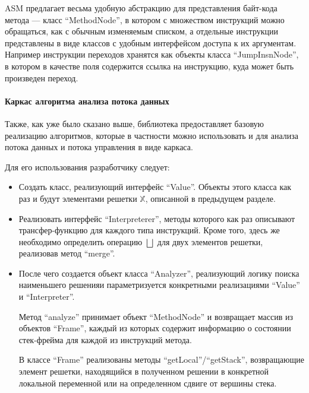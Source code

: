 ASM предлагает весьма удобную абстракцию для представления байт-кода метода --- класс
``MethodNode'', в котором с множеством инструкций можно обращаться, как с обычным изменяемым
списком, а отдельные инструкции представлены в виде классов с удобным интерфейсом доступа
к их аргументам. Например инструкции переходов хранятся как объекты класса ``JumpInsnNode'',
в котором в качестве поля содержится ссылка на инструкцию, куда может быть произведен переход.

\paragraph{Каркас алгоритма анализа потока данных}
Также, как уже было сказано выше, библиотека предоставляет базовую реализацию алгоритмов, которые
в частности можно использовать и для анализа потока данных и потока управления в виде каркаса.

Для его использования разработчику следует:
\begin{itemize}
    \item Создать класс, реализующий интерфейс ``Value''. Объекты этого класса как раз и будут
    элементами решетки $\mathbb{X}$, описанной в предыдущем разделе.

    \item Реализовать интерфейс ``Interpreterer'', методы которого как раз описывают трансфер-функцию
    для каждого типа инструкций.
    Кроме того, здесь же необходимо определить операцию $\bigsqcup$ для двух элементов
    решетки, реализовав метод ``merge''.

    \item После чего создается объект класса ``Analyzer'', реализующий логику поиска наименьшего
    решенияи параметризуется конкретными реализациями ``Value'' и ``Interpreter''.

    Метод ``analyze'' принимает объект ``MethodNode'' и возвращает массив из объектов ``Frame'',
    каждый из которых содержит информацию о состоянии стек-фрейма для каждой из инструкций метода.

    В классе ``Frame'' реализованы методы ``getLocal''/``getStack'', возвращающие элемент решетки,
    находящийся в полученном решении в конкретной локальной переменной или на определенном сдвиге
    от вершины стека.
\end{itemize}

